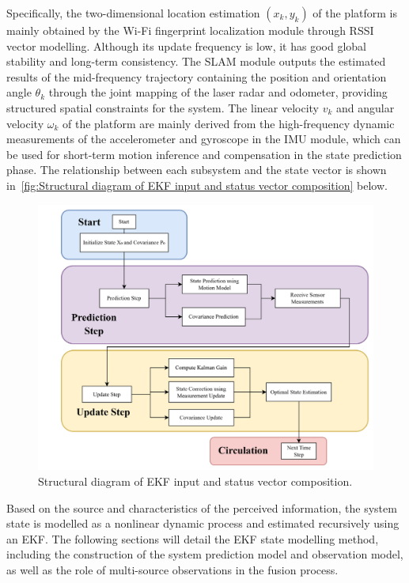 \documentclass[12pt,a4paper]{article}
\numberwithin{equation}{section}
\begin{document}
Specifically, the two-dimensional location estimation $(x_k, y_k)$ of the
platform is mainly obtained by the Wi-Fi fingerprint localization module through
RSSI vector modelling. Although its update frequency is low, it has good global
stability and long-term consistency. The SLAM module outputs the estimated
results of the mid-frequency trajectory containing the position and orientation
angle $\theta_k$ through the joint mapping of the laser radar and odometer,
providing structured spatial constraints for the system. The linear velocity
$v_k$ and angular velocity $\omega_k$ of the platform are mainly derived from
the high-frequency dynamic measurements of the accelerometer and gyroscope in
the IMU module, which can be used for short-term motion inference and
compensation in the state prediction phase. The relationship between each
subsystem and the state vector is shown in~\autoref{fig:Structural diagram of
  EKF input and status vector composition} below.
\begin{figure}[H]
  \centering
  \includegraphics[width=0.85\linewidth]{images/2.jpg}
  \caption{Structural diagram of EKF input and status vector composition.}
  \label{fig:Structural diagram of EKF input and status vector composition}
\end{figure}

Based on the source and characteristics of the perceived information, the system
state is modelled as a nonlinear dynamic process and estimated recursively using
an EKF. The following sections will detail the EKF state modelling method,
including the construction of the system prediction model and observation model,
as well as the role of multi-source observations in the fusion process.
\end{document}
